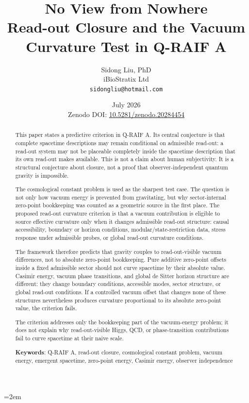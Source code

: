 \documentclass[12pt,a4paper]{article}
\title{%
  \textbf{No View from Nowhere}\\
  \large Read-out Closure and the Vacuum Curvature Test in Q-RAIF A%
}
\author{
  Sidong Liu, PhD \\
  \small iBioStratix Ltd \\
  \small \texttt{sidongliu@hotmail.com}
}
\date{July 2026\\
\small Zenodo DOI: \href{https://doi.org/10.5281/zenodo.20284454}{10.5281/zenodo.20284454}}
\theoremstyle{definition}
\theoremstyle{remark}
\begin{document}
\emergencystretch=2em
\raggedbottom
{}

\maketitle

\begin{abstract}
This paper states a predictive criterion in Q-RAIF A. Its central conjecture is that complete spacetime descriptions may remain conditional on admissible read-out: a read-out system may not be placeable completely inside the spacetime description that its own read-out makes available. This is not a claim about human subjectivity. It is a structural conjecture about closure, not a proof that observer-independent quantum gravity is impossible.

The cosmological constant problem is used as the sharpest test case. The question is not only how vacuum energy is prevented from gravitating, but why sector-internal zero-point bookkeeping was counted as a geometric source in the first place. The proposed read-out curvature criterion is that a vacuum contribution is eligible to source effective curvature only when it changes admissible read-out structure: causal accessibility, boundary or horizon conditions, modular/state-restriction data, stress response under admissible probes, or global read-out curvature conditions.

The framework therefore predicts that gravity couples to read-out-visible vacuum differences, not to absolute zero-point bookkeeping. Pure additive zero-point offsets inside a fixed admissible sector should not curve spacetime by their absolute value. Casimir energy, vacuum phase transitions, and global de Sitter horizon structure are different: they change boundary conditions, accessible modes, sector structure, or global read-out conditions. If a controlled vacuum offset that changes none of these structures nevertheless produces curvature proportional to its absolute zero-point value, the criterion fails.

The criterion addresses only the bookkeeping part of the vacuum-energy problem; it does not explain why read-out-visible Higgs, QCD, or phase-transition contributions fail to curve spacetime at their naive scale.

\medskip
\noindent\textbf{Keywords}: Q-RAIF A, read-out closure, cosmological constant problem, vacuum energy, emergent spacetime, zero-point energy, Casimir energy, observer independence
\end{abstract}
\end{document}
